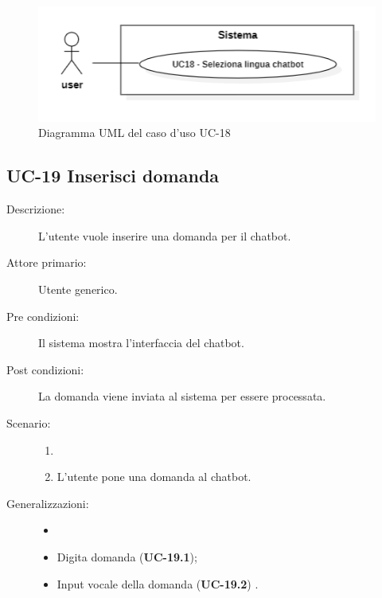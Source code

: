 \begin{figure}[H]
    \centering
    \includegraphics[width=0.8\linewidth]{UC18.PNG}
    \caption{Diagramma UML del caso d'uso UC-18}
    \label{fig:UC18}
\end{figure}

\subsection{UC-19 Inserisci domanda}
\begin{description}
    \item[Descrizione:] L'utente vuole inserire una domanda per il chatbot.
    \item[Attore primario:] Utente generico.
    \item[Pre condizioni:] Il sistema mostra l'interfaccia del chatbot.
    \item[Post condizioni:] La domanda viene inviata al sistema per essere processata.
    \item[Scenario:]
    \begin{enumerate}
        \item[]
        \item L’utente pone una domanda al chatbot.
    \end{enumerate}
    \item[Generalizzazioni:] 
    \begin{itemize}
        \item[] 
        \item Digita domanda (\textbf{UC-19.1});
        \item Input vocale della domanda (\textbf{UC-19.2}) .
    \end{itemize}
\end{description}

